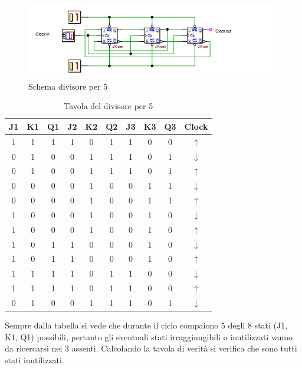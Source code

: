\documentclass[journal, a4paper]{IEEEtran}
\begin{document}
\begin{figure}[htp]
\centering
\includegraphics[scale=.8]{hm4}
\caption{Schema divisore per 5}
\label{fig:div5}
\end{figure}

\begin{table}[htp]
\centering
\caption{Tavola del divisore per 5}
\label{tab:div5}
\begin{tabular}{|c|c|c|c|c|c|c|c|c|c|}
\hline
J1 & K1 & Q1 & J2 & K2 & Q2 & J3 & K3 & Q3 & Clock \\ 
\hline 
1 & 1 & 1 & 1 & 0 & 1 & 1 & 0 & 0 & $\uparrow$ \\ 
\hline 
0 & 1 & 0 & 0 & 1 & 1 & 1 & 0 & 1 & $\downarrow$ \\ 
\hline 
0 & 1 & 0 & 0 & 1 & 1 & 1 & 0 & 1 & $\uparrow$ \\ 
\hline 
0 & 0 & 0 & 0 & 1 & 0 & 0 & 1 & 1 & $\downarrow$ \\ 
\hline
0 & 0 & 0 & 0 & 1 & 0 & 0 & 1 & 1 & $\uparrow$ \\ 
\hline 
1 & 0 & 0 & 0 & 1 & 0 & 0 & 1 & 0 & $\downarrow$ \\ 
\hline
1 & 0 & 0 & 0 & 1 & 0 & 0 & 1 & 0 & $\uparrow$ \\ 
\hline 
1 & 0 & 1 & 1 & 0 & 0 & 0 & 1 & 0 & $\downarrow$ \\ 
\hline 
1 & 0 & 1 & 1 & 0 & 0 & 0 & 1 & 0 & $\uparrow$ \\ 
\hline 
1 & 1 & 1 & 1 & 0 & 1 & 1 & 0 & 0 & $\downarrow$ \\ 
\hline
1 & 1 & 1 & 1 & 0 & 1 & 1 & 0 & 0 & $\uparrow$ \\ 
\hline 
0 & 1 & 0 & 0 & 1 & 1 & 1 & 0 & 1 & $\downarrow$ \\ 
\hline 
\end{tabular} 
\end{table}

Sempre dalla tabella si vede che durante il ciclo compaiono 5 degli 8 stati (J1, K1, Q1) possibili, pertanto gli eventuali stati irraggiungibili o inutilizzati vanno da ricercarsi nei 3 assenti. Calcolando la tavola di verità si verifica che sono tutti stati inutilizzati.
\end{document}
